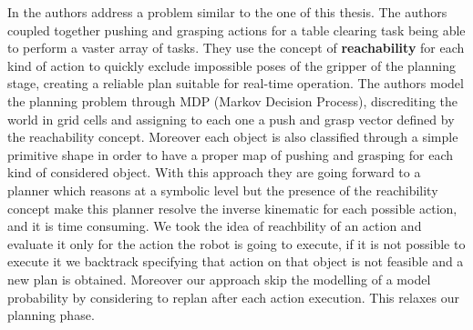 

In \citep{coelhoplanning} the authors address a problem similar to the one of this thesis. The authors coupled together pushing and grasping actions for a table clearing task being able to perform a vaster array of tasks.
They use the concept of \textbf{reachability} \citep{vahrenkamp2013robot} for each kind of action to quickly exclude impossible poses of the gripper of the planning stage, creating a reliable plan suitable for real-time operation. The authors model the planning problem through MDP (Markov Decision Process), discrediting the world in grid cells and assigning to each one a push and grasp vector defined by the reachability concept. Moreover each object is also classified through a simple primitive shape in order to have a proper map of pushing and grasping for each kind of considered object. With this approach they are going forward to a planner which reasons at a symbolic level but the presence of the reachibility concept make this planner resolve the inverse kinematic for each possible action, and it is time consuming.  We took the idea of reachbility of an action and evaluate it only for the action the robot is going to execute, if it is not possible to execute it we backtrack specifying that action on that object is not feasible and a new plan is obtained. Moreover our approach skip the modelling of a model probability by considering to replan after each action execution. This relaxes our planning phase. 

